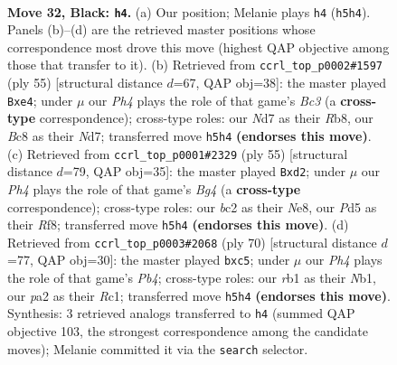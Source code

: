 \documentclass[11pt]{article}
\begin{document}
\clearpage

\begin{figure}[p]\centering
\begin{subfigure}{0.46\textwidth}\centering
\resizebox{\linewidth}{!}{%
\newchessgame
\chessboard[
  setfen={1nb5/rp1n2k1/5p2/p2p2pp/1b4P1/NP2P2P/PBB1PK2/1R6 b - - 0 32},
  showmover=false,
  pgfstyle=straightmove, color=movearrow, markmove={h5-h4}
]}
\caption{}
\end{subfigure}\hfill
\begin{subfigure}{0.46\textwidth}\centering
\resizebox{\linewidth}{!}{%
\newchessgame
\chessboard[
  setfen={1r6/3n1kp1/1pbpp2p/2p5/2P1BP1P/2P1P3/3NK1P1/1R6 b - - 2 28},
  showmover=false,
  pgfstyle=straightmove, color=movearrow, markmove={c6-e4}
]}
\caption{}
\end{subfigure}
\\[4pt]
\begin{subfigure}{0.46\textwidth}\centering
\resizebox{\linewidth}{!}{%
\newchessgame
\chessboard[
  setfen={4nrk1/1p3pp1/pB2p2p/P3P1b1/bn6/2N5/1P1NB1PP/5R1K b - - 1 28},
  showmover=false,
  pgfstyle=straightmove, color=movearrow, markmove={g5-d2}
]}
\caption{}
\end{subfigure}\hfill
\begin{subfigure}{0.46\textwidth}\centering
\resizebox{\linewidth}{!}{%
\newchessgame
\chessboard[
  setfen={4r3/5pnk/4b1pp/1pp5/1P2PRP1/2P1P2P/r1B4K/1NR5 w - - 0 36},
  showmover=false,
  pgfstyle=straightmove, color=movearrow, markmove={b4-c5}
]}
\caption{}
\end{subfigure}
\caption{\textbf{Move 32, Black: \texttt{h4}.} (a) Our position; Melanie plays \texttt{h4} (\texttt{h5h4}). Panels (b)--(d) are the retrieved master positions whose correspondence most drove this move (highest QAP objective among those that transfer to it). (b) Retrieved from \texttt{ccrl\_top\_p0002\#1597} (ply 55) [structural distance $d$=67, QAP obj=38]: the master played \texttt{Bxe4}; under $\mu$ our \emph{Ph4} plays the role of that game's \emph{Bc3} (a \textbf{cross-type} correspondence); cross-type roles: our \emph{N}d7 as their \emph{R}b8, our \emph{B}c8 as their \emph{N}d7; transferred move \texttt{h5h4} \textbf{(endorses this move)}. (c) Retrieved from \texttt{ccrl\_top\_p0001\#2329} (ply 55) [structural distance $d$=79, QAP obj=35]: the master played \texttt{Bxd2}; under $\mu$ our \emph{Ph4} plays the role of that game's \emph{Bg4} (a \textbf{cross-type} correspondence); cross-type roles: our \emph{b}c2 as their \emph{N}e8, our \emph{P}d5 as their \emph{R}f8; transferred move \texttt{h5h4} \textbf{(endorses this move)}. (d) Retrieved from \texttt{ccrl\_top\_p0003\#2068} (ply 70) [structural distance $d$=77, QAP obj=30]: the master played \texttt{bxc5}; under $\mu$ our \emph{Ph4} plays the role of that game's \emph{Pb4}; cross-type roles: our \emph{r}b1 as their \emph{N}b1, our \emph{p}a2 as their \emph{R}c1; transferred move \texttt{h5h4} \textbf{(endorses this move)}. Synthesis: 3 retrieved analogs transferred to \texttt{h4} (summed QAP objective 103, the strongest correspondence among the candidate moves); Melanie committed it via the \texttt{search} selector.}
\label{fig:thought-m63}
\end{figure}
\end{document}
